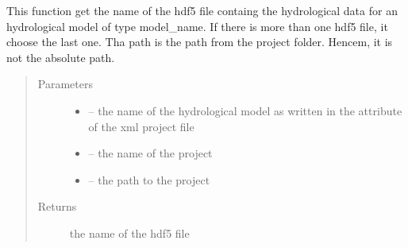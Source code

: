 \documentclass[letterpaper,10pt,english]{sphinxmanual}
\begin{document}

\begin{fulllineitems}
\label{\detokenize{index:src.load_hdf5.get_hdf5_name}}
This function get the name of the hdf5 file containg the hydrological data for an hydrological model of type
model\_name. If there is more than one hdf5 file, it choose the last one. Tha path is the path from the
project folder. Hencem, it is not the absolute path.
\begin{quote}\begin{description}
\item[{Parameters}] \leavevmode\begin{itemize}
\item {} 
 -- the name of the hydrological model as written in the attribute of the xml project file

\item {} 
 -- the name of the project

\item {} 
 -- the path to the project

\end{itemize}

\item[{Returns}] \leavevmode
the name of the hdf5 file

\end{description}\end{quote}

\end{fulllineitems}

\end{document}
